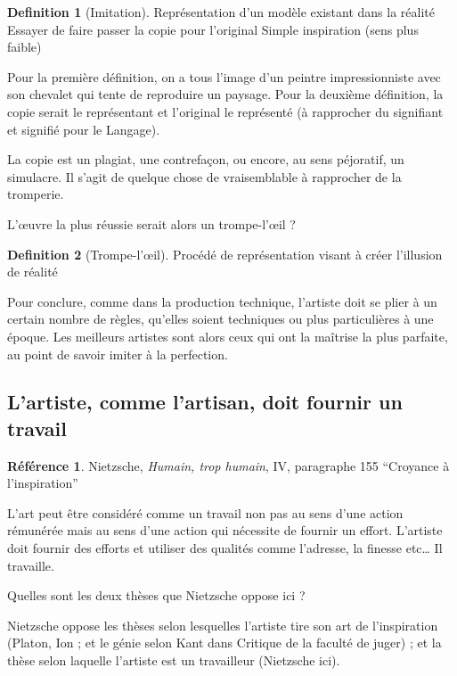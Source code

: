 \documentclass[french]{book}
\theoremstyle{definition}
\newtheorem*{dfn}{Definition}
\newtheorem*{refe}{Référence}
\begin{document}
\begin{dfn}[Imitation]
Représentation d’un modèle existant dans la réalité
Essayer de faire passer la copie pour l’original
Simple inspiration (sens plus faible)
\end{dfn}

Pour la première définition, on a tous l’image d’un peintre impressionniste avec son chevalet qui tente de reproduire un paysage.
Pour la deuxième définition, la copie serait le représentant et l’original le représenté (à rapprocher du signifiant et signifié pour le Langage).

La copie est un plagiat, une contrefaçon, ou encore, au sens péjoratif, un simulacre. Il s’agit de quelque chose de vraisemblable à rapprocher de la tromperie.

L'œuvre la plus réussie serait alors un trompe-l’œil ?

\begin{dfn}[Trompe-l’œil]
Procédé de représentation visant à créer l’illusion de réalité
\end{dfn}

Pour conclure, comme dans la production technique, l’artiste doit se plier à un certain nombre de règles, qu’elles soient techniques ou plus particulières à une époque. Les meilleurs artistes sont alors ceux qui ont la maîtrise la plus parfaite, au point de savoir imiter à la perfection.

\subsection{L’artiste, comme l’artisan, doit fournir un travail}

\begin{refe}
	Nietzsche, \textit{Humain, trop humain}, IV, paragraphe 155 “Croyance à l’inspiration”
\end{refe}

L’art peut être considéré comme un travail non pas au sens d’une action rémunérée mais au sens d’une action qui nécessite de fournir un effort.
L’artiste doit fournir des efforts et utiliser des qualités comme l'adresse, la finesse etc… Il travaille.

Quelles sont les deux thèses que Nietzsche oppose ici ?

Nietzsche oppose les thèses selon lesquelles l’artiste tire son art de l’inspiration (Platon, Ion ; et le génie selon Kant dans Critique de la faculté de juger) ; et la thèse selon laquelle l’artiste est un travailleur (Nietzsche ici).
\end{document}
